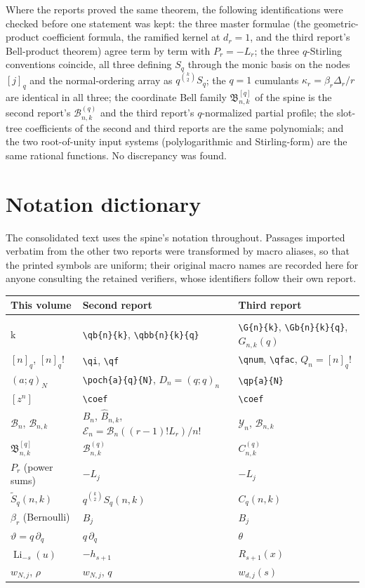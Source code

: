 \documentclass[11pt,a4paper,oneside,openany]{book}
\theoremstyle{definition}
\theoremstyle{remark}
\newcommand{\GB}[3][q]{\begin{bmatrix}#2\\#3\end{bmatrix}_{#1}}
\newcommand{\qi}[2][q]{[#2]_{#1}}
\newcommand{\qf}[2][q]{[#2]_{#1}!}
\newcommand{\Y}[1]{\mathcal B_{#1}}
\newcommand{\B}[2]{\mathcal B_{#1,#2}}
\newcommand{\qB}[2]{\mathfrak B^{[q]}_{#1,#2}}
\DeclareMathOperator{\Li}{Li}
\newcommand{\logq}{\vartheta}
\newcommand{\qb}[2]{\GB{#1}{#2}}
\newcommand{\qbb}[3]{\GB[#3]{#1}{#2}}
\newcommand{\poch}[3]{(#1;#2)_{#3}}
\newcommand{\coef}[2]{[#1^{#2}]}
\newcommand{\Ecal}{\mathcal E}
\newcommand{\Bhat}{\widehat B}
\newcommand{\G}[2]{\GB{#1}{#2}}
\newcommand{\Gb}[3]{\GB[#3]{#1}{#2}}
\newcommand{\qnum}[1]{[#1]_q}
\newcommand{\qfac}[1]{[#1]_q!}
\newcommand{\qp}[2]{(#1;q)_{#2}}
\newcommand{\Bcal}{\mathcal B}
\begin{document}
Where the reports proved the same theorem, the following identifications
were checked before one statement was kept: the three master formulae (the
geometric-product coefficient formula, the ramified kernel at
\(d_r=1\), and the third report's Bell-product theorem) agree term by term
with \(P_r=-L_r\); the three \(q\)-Stirling conventions coincide, all three
defining \(S_q\) through the monic basis on the nodes \([j]_q\) and the
normal-ordering array as \(q^{\binom k2}S_q\); the \(q=1\) cumulants
\(\kappa_r=\beta_r\Delta_r/r\) are identical in all three; the coordinate
Bell family \(\qB nk\) of the spine is the second report's
\(\mathcal B^{(q)}_{n,k}\) and the third report's \(q\)-normalized partial
profile; the slot-tree coefficients of the second and third reports are the
same polynomials; and the two root-of-unity input systems (polylogarithmic
and Stirling-form) are the same rational functions. No discrepancy was found.

\section{Notation dictionary}
The consolidated text uses the spine's notation throughout. Passages
imported verbatim from the other two reports were transformed by macro
aliases, so that the printed symbols are uniform; their original macro names
are recorded here for anyone consulting the retained verifiers, whose
identifiers follow their own report.
\begin{center}\small
\begin{tabular}{@{}lll@{}}
\toprule
This volume & Second report & Third report\\
\midrule
\(\GB nk\) & \verb|\qb{n}{k}|, \verb|\qbb{n}{k}{q}| & \verb|\G{n}{k}|, \verb|\Gb{n}{k}{q}|, \(G_{n,k}(q)\)\\
\([n]_q\), \([n]_q!\) & \verb|\qi|, \verb|\qf| & \verb|\qnum|, \verb|\qfac|, \(Q_n=[n]_q!\)\\
\((a;q)_N\) & \verb|\poch{a}{q}{N}|, \(D_n=(q;q)_n\) & \verb|\qp{a}{N}|\\
\([z^n]\) & \verb|\coef| & \verb|\coef|\\
\(\Y n\), \(\B nk\) & \(B_n\), \(\Bhat_{n,k}\), \(\Ecal_n=\Y n((r-1)!L_r)/n!\) & \(\mathcal Y_n\), \(\Bcal_{n,k}\)\\
\(\qB nk\) & \(\mathcal B^{(q)}_{n,k}\) & \(C^{(q)}_{n,k}\)\\
\(P_r\) (power sums) & \(-L_j\) & \(-L_j\)\\
\(\widetilde S_q(n,k)\) & \(q^{\binom k2}S_q(n,k)\) & \(C_q(n,k)\)\\
\(\beta_r\) (Bernoulli) & \(B_j\) & \(B_j\)\\
\(\logq=q\,\partial_q\) & \(q\,\partial_q\) & \(\theta\)\\
\(\Li_{-s}(u)\) & \(-h_{s+1}\) & \(R_{s+1}(x)\)\\
\(w_{N,j}\), \(\rho\) & \(w_{N,j}\), \(q\) & \(w_{d,j}(s)\)\\
\bottomrule
\end{tabular}
\end{center}
\end{document}
